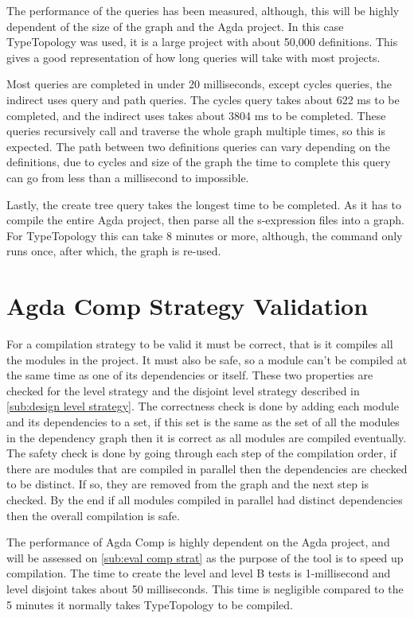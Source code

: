 The performance of the queries has been measured, although, this will be highly
dependent of the size of the graph and the Agda project. In this case
TypeTopology was used, it is a large project with about 50,000 definitions.
This gives a good representation of how long queries will take with most
projects.

 Most queries
are completed in under 20 milliseconds, except cycles queries, the indirect
uses query and path queries. The cycles query takes about 622 ms to be
completed, and the indirect uses takes about 3804 ms to be completed. These
queries recursively call and traverse the whole graph multiple times, so this
is expected. The path between two definitions queries can vary depending on the
definitions, due to cycles and size of the graph the time to complete this
query can go from less than a millisecond to impossible.

Lastly, the create tree query takes the longest time to be completed. As it has
to compile the entire Agda project, then parse all the s-expression files into
a graph. For TypeTopology this can take 8 minutes or more, although, the
command only runs once, after which, the graph is re-used.

\section{Agda Comp Strategy Validation}

For a compilation strategy to be valid it must be correct, that is it compiles
all the modules in the project. It must also be safe, so a module can't be
compiled at the same time as one of its dependencies or itself. These two
properties are checked for the level strategy and the disjoint level strategy
described in \cref{sub:design level strategy}. The correctness check is done by
adding each module and its dependencies to a set, if this set is the same as
the set of all the modules in the dependency graph then it is correct as all
modules are compiled eventually. The safety check is done by going through each
step of the compilation order, if there are modules that are compiled in
parallel then the dependencies are checked to be distinct. If so, they are
removed from the graph and the next step is checked. By the end if all modules
compiled in parallel had distinct dependencies then the overall compilation is
safe.

The performance of Agda Comp is highly dependent on the Agda project, and will
be assessed on \cref{sub:eval comp strat} as the purpose of the tool is to
speed up compilation. The time to create the level and level B tests is
1-millisecond and level disjoint takes about 50 milliseconds. This time is
negligible compared to the 5 minutes it normally takes TypeTopology to be
compiled.

